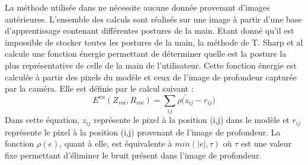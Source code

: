 La méthode utilisée dans \cite{export:238453} ne nécessite aucune donnée provenant d'images antérieures. L'ensemble
des calculs sont réalisés sur une image à partir d'une base d'apprentissage contenant différentes postures de la
main. Etant donné qu'il est impossible de stocker toutes les postures de la main, la méthode de T. Sharp et al \cite{export:238453}
calcule une fonction énergie permettant de déterminer quelle est la posture la plus représentative de celle de la main
de l'utilisateur. Cette fonction énergie est calculée à partir des pixels du modèle et ceux de l'image de profondeur
capturée par la caméra. Elle est définie par le calcul suivant :
\begin{equation}
 E^{au}(Z_{roi}, R_{roi}) = \sum_{ij} \bar{\rho(z_{ij}} - r_{ij})
\end{equation}
Dans cette équation, $z_{ij}$ représente le pixel à la position (i,j) dans le modèle et $r_{ij}$ représente le pixel à la position (i,j)
provenant de l'image de profondeur. La fonction $\rho(e)$, quant à elle, est équivalente à $min(|e|,\tau)$ où $\tau$ est une valeur fixe permettant d'éliminer le bruit présent dans l'image de profondeur.



